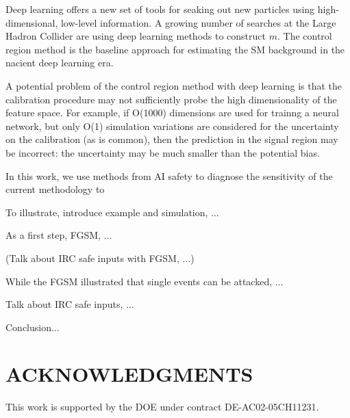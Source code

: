\documentclass[reprint,nofootinbib,...]{revtex4-1}
\begin{document}
Deep learning offers a new set of tools for seaking out new particles using high-dimensional, low-level information. A growing number of searches at the Large Hadron Collider are using deep learning methods to construct $m$. The control region method is the baseline approach for estimating the SM background in the nacient deep learning era.

A potential problem of the control region method with deep learning is that the calibration procedure may not sufficiently probe the high dimensionality of the feature space.  For example, if O(1000) dimensions are used for trainng a neural network, but only O(1) simulation variations are considered for the uncertainty on the calibration (as is common), then the prediction in the signal region may be incorrect: the uncertainty may be much smaller than the potential bias.

In this work, we use methods from AI safety to diagnose the sensitivity of the current methodology to 

To illustrate, introduce example and simulation, ...

As a first step, FGSM, ...

(Talk about IRC safe inputs with FGSM, ...)

While the FGSM illustrated that single events can be attacked, ...

Talk about IRC safe inputs, ...

Conclusion...


\section*{ACKNOWLEDGMENTS}

This work is supported by the DOE under contract DE-AC02-05CH11231. 


\end{document}
